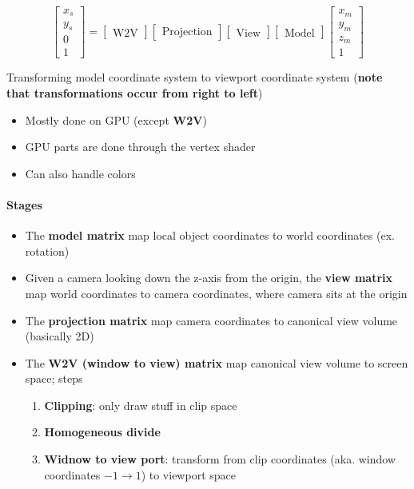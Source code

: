   \begin{equation}
    \begin{bmatrix}
      x_{s} \\
      y_{s} \\
      0 \\
      1
    \end{bmatrix}
    =
    \begin{bmatrix}
      \text{W2V}
    \end{bmatrix}
    \begin{bmatrix}
      \text{Projection}
    \end{bmatrix}
    \begin{bmatrix}
      \text{View}
    \end{bmatrix}
    \begin{bmatrix}
      \text{Model}
    \end{bmatrix}
    \begin{bmatrix}
      x_{m} \\
      y_{m} \\
      z_{m} \\
      1
    \end{bmatrix}
  \end{equation}

  Transforming model coordinate system to viewport coordinate system
  (\textbf{note that transformations occur from right to left})

  \begin{itemize}
    \item Mostly done on GPU (except \textbf{W2V})
    \item GPU parts are done through the vertex shader
    \item Can also handle colors
  \end{itemize}

  \paragraph{Stages}
  \begin{itemize}
    \item The \textbf{model matrix} map local object coordinates to
    world coordinates (ex. rotation)
    \item Given a camera looking down the z-axis from the origin,
    the \textbf{view matrix} map world coordinates to camera coordinates,
    where camera sits at the origin
    \item The \textbf{projection matrix} map camera coordinates to canonical
    view volume (basically 2D)
    \item The \textbf{W2V (window to view) matrix} map canonical view volume
    to screen space; steps
    \begin{enumerate}
      \item \textbf{Clipping}: only draw stuff in clip space
      \item \textbf{Homogeneous divide}
      \item \textbf{Widnow to view port}: transform from clip coordinates
      (aka. window coordinates $ -1 \to 1 $) to viewport space
    \end{enumerate}
  \end{itemize}

